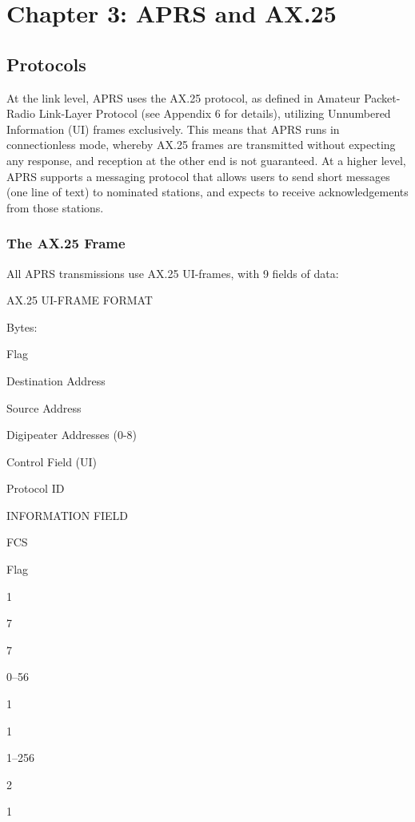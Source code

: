 \chapter{Chapter 3: APRS and AX.25}



\section{Protocols}

At the link level, APRS uses the AX.25 protocol, as defined in Amateur
Packet-Radio Link-Layer Protocol (see Appendix 6 for details), utilizing
Unnumbered Information (UI) frames exclusively. This means that APRS
runs in connectionless mode, whereby AX.25 frames are transmitted without
expecting any response, and reception at the other end is not guaranteed.
At a higher level, APRS supports a messaging protocol that allows users to
send short messages (one line of text) to nominated stations, and expects to
receive acknowledgements from those stations.

\subsection{The AX.25 Frame}

All APRS transmissions use AX.25 UI-frames, with 9 fields of data:







AX.25 UI-FRAME FORMAT

Bytes:

Flag

Destination
Address

Source
Address

Digipeater
Addresses
(0-8)

Control
Field
(UI)

Protocol
ID

INFORMATION FIELD

FCS

Flag

1

7

7

0–56

1

1

1–256

2

1




